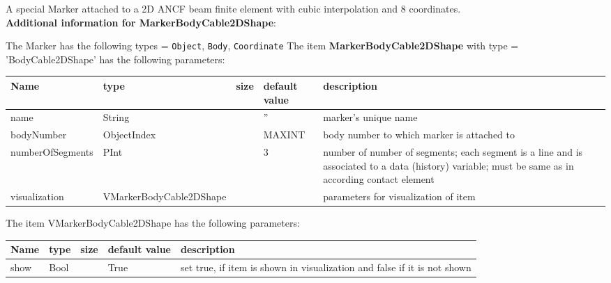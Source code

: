 \label{sec:item:MarkerBodyCable2DShape}
A special Marker attached to a 2D ANCF beam finite element with cubic interpolation and 8 coordinates.\vspace{12pt}
 \\{\bf Additional information for MarkerBodyCable2DShape}:
\bi
  \item The Marker has the following types = \texttt{Object}, \texttt{Body}, \texttt{Coordinate}
\ei
\vspace{12pt} \noindent The item {\bf MarkerBodyCable2DShape} with type = 'BodyCable2DShape' has the following parameters:\vspace{-1cm}\\ 
\begin{center}
  \footnotesize
  \begin{longtable}{| p{4.5cm} | p{2.5cm} | p{0.5cm} | p{2.5cm} | p{6cm} |}
    \hline
    \bf Name & \bf type & \bf size & \bf default value & \bf description \\ \hline
    name &     String &      &     '' &     marker's unique name\\ \hline
    bodyNumber &     ObjectIndex &      &     MAXINT &     body number to which marker is attached to\\ \hline
    numberOfSegments &     PInt &      &     3 &     number of number of segments; each segment is a line and is associated to a data (history) variable; must be same as in according contact element\\ \hline
    visualization & VMarkerBodyCable2DShape & & & parameters for visualization of item \\ \hline
	  \end{longtable}
	\end{center}
The item VMarkerBodyCable2DShape has the following parameters:\vspace{-1cm}\\ 
\begin{center}
  \footnotesize
  \begin{longtable}{| p{4.5cm} | p{2.5cm} | p{0.5cm} | p{2.5cm} | p{6cm} |}
    \hline
    \bf Name & \bf type & \bf size & \bf default value & \bf description \\ \hline
    show &     Bool &      &     True &     set true, if item is shown in visualization and false if it is not shown\\ \hline
	  \end{longtable}
	\end{center}
